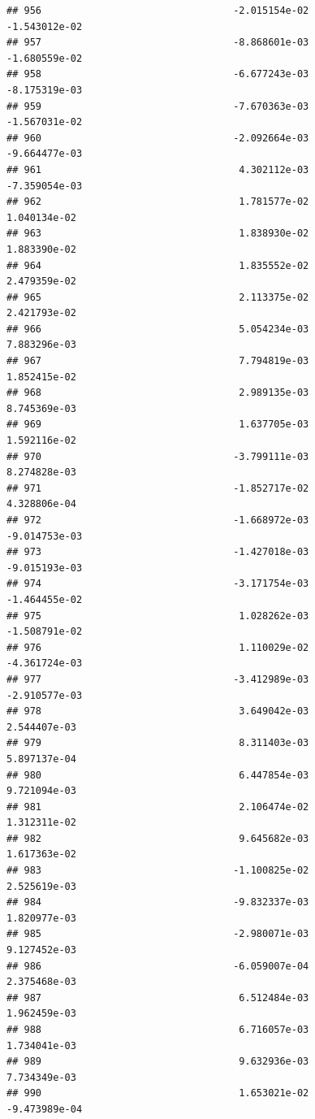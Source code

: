 \documentclass[
]{article}
\begin{document}
\begin{verbatim}
## 956                                 -2.015154e-02          -1.543012e-02
## 957                                 -8.868601e-03          -1.680559e-02
## 958                                 -6.677243e-03          -8.175319e-03
## 959                                 -7.670363e-03          -1.567031e-02
## 960                                 -2.092664e-03          -9.664477e-03
## 961                                  4.302112e-03          -7.359054e-03
## 962                                  1.781577e-02           1.040134e-02
## 963                                  1.838930e-02           1.883390e-02
## 964                                  1.835552e-02           2.479359e-02
## 965                                  2.113375e-02           2.421793e-02
## 966                                  5.054234e-03           7.883296e-03
## 967                                  7.794819e-03           1.852415e-02
## 968                                  2.989135e-03           8.745369e-03
## 969                                  1.637705e-03           1.592116e-02
## 970                                 -3.799111e-03           8.274828e-03
## 971                                 -1.852717e-02           4.328806e-04
## 972                                 -1.668972e-03          -9.014753e-03
## 973                                 -1.427018e-03          -9.015193e-03
## 974                                 -3.171754e-03          -1.464455e-02
## 975                                  1.028262e-03          -1.508791e-02
## 976                                  1.110029e-02          -4.361724e-03
## 977                                 -3.412989e-03          -2.910577e-03
## 978                                  3.649042e-03           2.544407e-03
## 979                                  8.311403e-03           5.897137e-04
## 980                                  6.447854e-03           9.721094e-03
## 981                                  2.106474e-02           1.312311e-02
## 982                                  9.645682e-03           1.617363e-02
## 983                                 -1.100825e-02           2.525619e-03
## 984                                 -9.832337e-03           1.820977e-03
## 985                                 -2.980071e-03           9.127452e-03
## 986                                 -6.059007e-04           2.375468e-03
## 987                                  6.512484e-03           1.962459e-03
## 988                                  6.716057e-03           1.734041e-03
## 989                                  9.632936e-03           7.734349e-03
## 990                                  1.653021e-02          -9.473989e-04

\end{verbatim}
\end{document}
